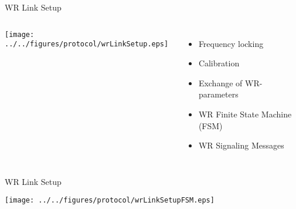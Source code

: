\documentclass[compress,red]{beamer}
\begin{document}
\begin{frame}{WR Link Setup }

  \begin{columns}[c]

      \begin{center}
      \texttt{[image: ../../figures/protocol/wrLinkSetup.eps]}
      \end{center}



      \begin{itemize}
	\item Frequency locking
	\item Calibration
	\item Exchange of WR-parameters
	\item WR Finite State Machine (FSM)
	\item WR Signaling Messages
      \end{itemize}

  \end{columns}

\end{frame}
\begin{frame}{WR Link Setup}

      \begin{center}
      \texttt{[image: ../../figures/protocol/wrLinkSetupFSM.eps]}
      \end{center}

\end{frame}
\end{document}
